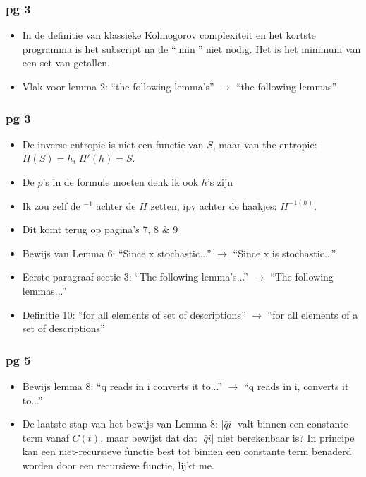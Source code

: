 \documentclass{article}
\theoremstyle{definition}
\begin{document}
\subsubsection*{pg 3}
\begin{itemize}

   \item In de definitie van klassieke Kolmogorov complexiteit en het kortste programma is het subscript na de ``$\min$'' niet nodig. Het is het minimum van een set van getallen.
    
   \item     Vlak voor lemma 2: ``the following lemma's''  $\rightarrow$  ``the following lemmas''
\end{itemize}


\subsubsection*{pg 3}

\begin{itemize}
  \item   De inverse entropie is niet een functie van $S$, maar van the entropie: $H(S) = h$, $H'(h) = S$.
  \item        De $p$'s in de formule moeten denk ik ook $h$'s zijn
  \item        Ik zou zelf de $^{-1}$ achter de $H$ zetten, ipv achter de haakjes: $H^{-1(h)}$.
  \item        Dit komt terug op pagina's 7, 8 \& 9
  \item    Bewijs van Lemma 6: ``Since x stochastic...''  $\rightarrow$  ``Since x is stochastic...''
  \item    Eerste paragraaf sectie 3: ``The following lemma's...''  $\rightarrow$  ``The following lemmas...''
  \item    Definitie 10: ``for all elements of set of descriptions''  $\rightarrow$  ``for all elements of a set of descriptions''
\end{itemize}


\subsubsection*{pg 5}
\begin{itemize}

  \item      Bewijs lemma 8: ``q reads in i converts it to...''  $\rightarrow$  ``q reads in i, converts it to...''
  \item      De laatste stap van het bewijs van Lemma 8: $|\bar{q}i|$ valt binnen een constante term vanaf $C(t)$, maar bewijst dat dat $|\bar{q}i|$ niet berekenbaar is? In principe kan een niet-recursieve functie best tot binnen een constante term benaderd worden door een recursieve functie, lijkt me.
\end{itemize}
\end{document}
